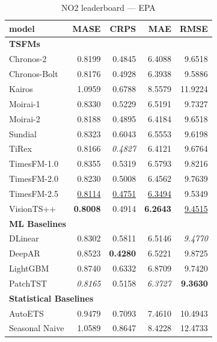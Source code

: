 \begin{table}[H]
\caption{NO2 leaderboard --- EPA}
\centering
\begin{small}
\begin{tabular}{lrrrr}
\toprule
model & MASE & CRPS & MAE & RMSE \\
\midrule
\multicolumn{5}{l}{\textbf{TSFMs}} \\
Chronos-2 & 0.8199 & 0.4845 & 6.4088 & 9.6518 \\
Chronos-Bolt & 0.8176 & 0.4928 & 6.3938 & 9.5886 \\
Kairos & 1.0959 & 0.6788 & 8.5579 & 11.9224 \\
Moirai-1 & 0.8330 & 0.5229 & 6.5191 & 9.7327 \\
Moirai-2 & 0.8188 & 0.4895 & 6.4184 & 9.6518 \\
Sundial & 0.8323 & 0.6043 & 6.5553 & 9.6198 \\
TiRex & 0.8166 & \textit{0.4827} & 6.4121 & 9.6764 \\
TimesFM-1.0 & 0.8355 & 0.5319 & 6.5793 & 9.8216 \\
TimesFM-2.0 & 0.8230 & 0.5008 & 6.4562 & 9.7639 \\
TimesFM-2.5 & \underline{0.8114} & \underline{0.4751} & \underline{6.3494} & 9.5349 \\
VisionTS++ & \textbf{0.8008} & 0.4914 & \textbf{6.2643} & \underline{9.4515} \\
\midrule
\multicolumn{5}{l}{\textbf{ML Baselines}} \\
DLinear & 0.8302 & 0.5811 & 6.5146 & \textit{9.4770} \\
DeepAR & 0.8523 & \textbf{0.4280} & 6.5221 & 9.8725 \\
LightGBM & 0.8740 & 0.6332 & 6.8709 & 9.7420 \\
PatchTST & \textit{0.8165} & 0.5158 & \textit{6.3727} & \textbf{9.3630} \\
\midrule
\multicolumn{5}{l}{\textbf{Statistical Baselines}} \\
AutoETS & 0.9479 & 0.7093 & 7.4610 & 10.4943 \\
Seasonal Naive & 1.0589 & 0.8647 & 8.4228 & 12.4733 \\
\bottomrule
\end{tabular}
\end{small}
\end{table}